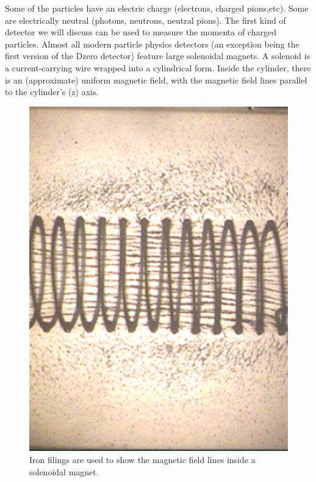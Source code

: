 Some of the particles have an electric charge (electrons, charged pions,etc). Some are electrically neutral (photons, neutrons, neutral pions).  The first kind of detector we will discuss can be used to measure the momenta of charged particles.
Almost all modern particle physics detectors (an exception being the first version of the Dzero detector) feature large solenoidal magnets.  A solenoid is a current-carrying wire wrapped into a cylindrical form. Inside the cylinder, there is an (approximate) uniform magnetic field, with the magnetic field lines parallel to the cylinder's (z) axis. 
\begin{figure}[h]
\centering\includegraphics[scale=0.5]{./Trackers/Pictures/fig2.pdf}
\caption{Iron filings are used to show the magnetic field lines inside a solenoidal magnet.}
\label{fig:trk2}
\end{figure}

